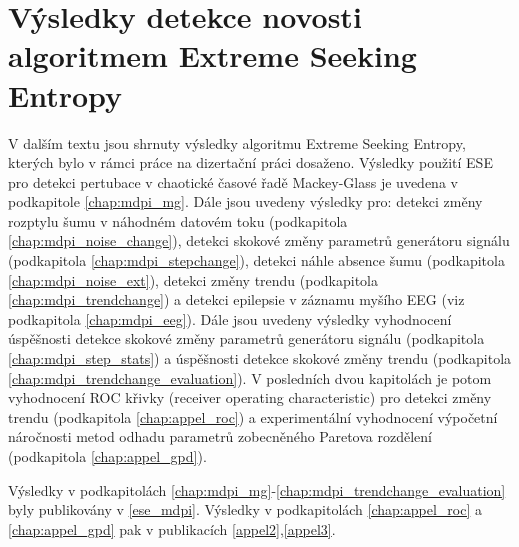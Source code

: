\chapter{Výsledky detekce novosti algoritmem Extreme Seeking Entropy}\label{chap:vysledky}
V dalším textu jsou shrnuty výsledky algoritmu Extreme Seeking Entropy, kterých bylo v rámci práce na dizertační práci dosaženo. Výsledky použití ESE pro detekci pertubace v chaotické časové řadě Mackey-Glass je uvedena v podkapitole \ref{chap:mdpi_mg}. Dále jsou uvedeny výsledky pro: detekci změny rozptylu šumu v náhodném datovém toku (podkapitola \ref{chap:mdpi_noise_change}), detekci skokové změny parametrů generátoru signálu (podkapitola \ref{chap:mdpi_stepchange}), detekci náhle absence šumu (podkapitola \ref{chap:mdpi_noise_ext}), detekci změny trendu (podkapitola \ref{chap:mdpi_trendchange}) a detekci epilepsie v záznamu myšího EEG (viz podkapitola \ref{chap:mdpi_eeg}). Dále jsou uvedeny výsledky vyhodnocení úspěšnosti detekce skokové změny parametrů generátoru signálu (podkapitola \ref{chap:mdpi_step_stats}) a úspěšnosti detekce skokové změny trendu (podkapitola \ref{chap:mdpi_trendchange_evaluation}). V posledních dvou kapitolách je potom vyhodnocení ROC křivky (receiver operating characteristic) pro detekci změny trendu (podkapitola \ref{chap:appel_roc}) a experimentální vyhodnocení výpočetní náročnosti metod odhadu parametrů zobecněného Paretova rozdělení (podkapitola \ref{chap:appel_gpd}).
\par Výsledky v podkapitolách \ref{chap:mdpi_mg}-\ref{chap:mdpi_trendchange_evaluation} byly publikovány v \ref{ese_mdpi}. Výsledky v podkapitolách \ref{chap:appel_roc} a \ref{chap:appel_gpd} pak v publikacích \ref{appel2},\ref{appel3}.

